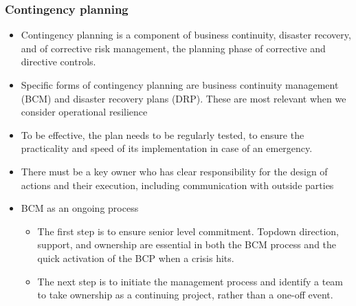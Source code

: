 \subsubsection{Contingency planning }
\begin{itemize}
\item Contingency planning is a component of business continuity, disaster recovery, and of corrective risk management, the planning phase of corrective and directive controls.
\item  Specific forms of contingency planning are business continuity management (BCM) and disaster recovery plans (DRP). These are most relevant when we consider operational resilience
\item To be effective, the plan needs to be regularly tested, to ensure the practicality and speed of its implementation in case of an emergency.
\item  There must be a key owner who has clear responsibility for the design of actions and their execution, including communication with outside parties
\item BCM as an ongoing process
    \begin{itemize}
    \item The first step is to ensure senior level commitment. Topdown direction, support, and ownership are essential in both the BCM process and the quick activation of the BCP when a crisis hits.
    \item The next step is to initiate the management process and identify a team to take ownership as a continuing project,
    rather than a one-off event.
    \end{itemize}
    
\end{itemize}


